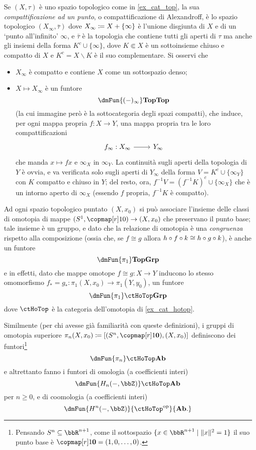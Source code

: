 \begin{example}
	Se $(X,\tau)$ è uno spazio topologico come in \ref{ex_cat_top}, la sua \emph{compattificazione ad un punto}, o compattificazione di Alexandroff, è lo spazio topologico $(X_\infty,\bar\tau)$ dove $X_\infty \coloneqq X + \{\infty\}$ è l'unione disgiunta di $X$ e di un `punto all'infinito' $\infty$, e $\bar\tau$ è la topologia che contiene tutti gli aperti di $\tau$ ma anche gli insiemi della forma $K^c \cup \{\infty\}$, dove $K\Subset X$ è un sottoinsieme chiuso e compatto di $X$ e $K^c = X\smallsetminus K$ è il suo complementare. Si osservi che
	\begin{itemize}
		\item $X_\infty$ è compatto e contiene $X$ come un sottospazio denso;
		\item $X\mapsto  X_\infty$ è un funtore
		\[\dmFun{(-)_\infty}\ctTop\ctTop\]
		(la cui immagine però è la sottocategoria degli spazi compatti), che induce, per ogni mappa propria $f : X\to Y$, una mappa propria tra le loro compattificazioni
		\[\begin{tikzcd}
			f_\infty : X_\infty \ar[r] & Y_\infty
		\end{tikzcd}\]
		che manda $x\mapsto fx$ e $\infty_X$ in $\infty_Y$. La continuità sugli aperti della topologia di $Y$ è ovvia, e va verificata solo sugli aperti di $Y_\infty$ della forma $V=K^c\cup\{\infty_Y\}$ con $K$ compatto e chiuso in $Y$; del resto, ora, $f^{-1}V = (f^{-1}K)^c \cup \{\infty_X\}$ che è un intorno aperto di $\infty_X$ (essendo $f$ propria, $f^{-1}K$ è compatto).
	\end{itemize}
\end{example}
\begin{example}\label{fun_ex_omoto_omolo}
	Ad ogni spazio topologico puntato $(X,x_0)$ si può associare l'insieme delle classi di omotopia di mappe $(S^1, \copmap[r] 10)\to (X, x_0)$ che preservano il punto base; tale insieme è un gruppo, e dato che la relazione di omotopia è una \emph{congruenza} rispetto alla composizione (ossia che, se $f\cong g$ allora $h\circ f\circ k\cong h\circ g\circ k$), è anche un funtore
	\[\dmFun{\pi_1}\ctTop\ctGrp\]
	e in effetti, dato che mappe omotope $f\cong g : X\to Y$ inducono lo stesso omomorfismo $f_* = g_* : \pi_1(X,x_0) \to \pi_1(Y,y_0)$, un funtore
	\[\dmFun{\pi_1}\ctHoTop\ctGrp\]
	dove $\ctHoTop$ è la categoria dell'omotopia di \ref{ex_cat_hotop}.

	Similmente (per chi avesse già familiarità con queste definizioni), i gruppi di omotopia superiore $\pi_n(X,x_0) \defeq [(S^n,\copmap[r] 1{\mathbf{0}}), (X,x_0)]$ definiscono dei funtori\footnote{Pensando $S^n\subseteq\bbR^{n+1}$, come il sottospazio $\{x\in\bbR^{n+1}\mid \|x\|^2=1\}$ il suo punto base è $\copmap[r]1{\mathbf 0}=(1,0,\dots,0)$.}
	\[\dmFun{\pi_n}\ctHoTop\ctAb\]
	e altrettanto fanno i funtori di omologia (a coefficienti interi)
	\[\dmFun{H_n(-,\bbZ)}\ctHoTop\ctAb\]
	per $n\ge 0$, e di coomologia (a coefficienti interi)
	\[\dmFun{H^n(-,\bbZ)}{\ctHoTop^\op}{\ctAb.}\]
\end{example}

